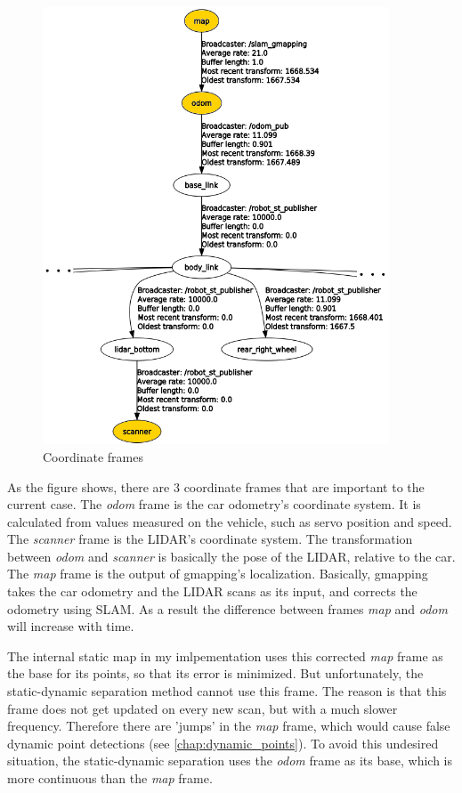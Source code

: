 \begin{figure}[!ht]
    \centering
    \includegraphics[height=130mm]{figures/raw/rqt_input.png}
    \caption{Coordinate frames}
    \label{rqt_input}
\end{figure}

As the figure shows, there are 3 coordinate frames that are important to the current case. The \textit{odom} frame is the car odometry's coordinate system. It is calculated from values measured on the vehicle, such as servo position and speed. The \textit{scanner} frame is the LIDAR's coordinate system. The transformation between \textit{odom} and \textit{scanner} is basically the pose of the LIDAR, relative to the car. The \textit{map} frame is the output of gmapping's localization. Basically, gmapping takes the car odometry and the LIDAR scans as its input, and corrects the odometry using SLAM. As a result the difference between frames \textit{map} and \textit{odom} will increase with time.

The internal static map in my imlpementation uses this corrected \textit{map} frame as the base for its points, so that its error is minimized. But unfortunately, the static-dynamic separation method cannot use this frame. The reason is that this frame does not get updated on every new scan, but with a much slower frequency. Therefore there are 'jumps' in the \textit{map} frame, which would cause false dynamic point detections (see \autoref{chap:dynamic_points}). To avoid this undesired situation, the static-dynamic separation uses the \textit{odom} frame as its base, which is more continuous than the \textit{map} frame.

